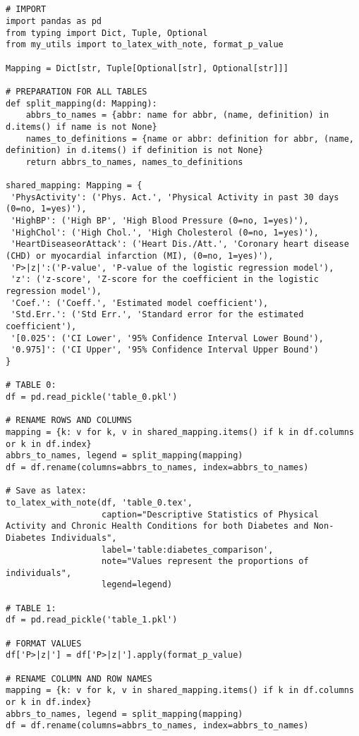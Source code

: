 \documentclass[11pt]{article}
\begin{document}
\begin{verbatim}


# IMPORT
import pandas as pd
from typing import Dict, Tuple, Optional
from my_utils import to_latex_with_note, format_p_value

Mapping = Dict[str, Tuple[Optional[str], Optional[str]]]

# PREPARATION FOR ALL TABLES
def split_mapping(d: Mapping):
    abbrs_to_names = {abbr: name for abbr, (name, definition) in d.items() if name is not None}
    names_to_definitions = {name or abbr: definition for abbr, (name, definition) in d.items() if definition is not None}
    return abbrs_to_names, names_to_definitions

shared_mapping: Mapping = {
 'PhysActivity': ('Phys. Act.', 'Physical Activity in past 30 days (0=no, 1=yes)'),
 'HighBP': ('High BP', 'High Blood Pressure (0=no, 1=yes)'),
 'HighChol': ('High Chol.', 'High Cholesterol (0=no, 1=yes)'),
 'HeartDiseaseorAttack': ('Heart Dis./Att.', 'Coronary heart disease (CHD) or myocardial infarction (MI), (0=no, 1=yes)'),
 'P>|z|':('P-value', 'P-value of the logistic regression model'),
 'z': ('z-score', 'Z-score for the coefficient in the logistic regression model'),
 'Coef.': ('Coeff.', 'Estimated model coefficient'),
 'Std.Err.': ('Std Err.', 'Standard error for the estimated coefficient'),
 '[0.025': ('CI Lower', '95% Confidence Interval Lower Bound'),
 '0.975]': ('CI Upper', '95% Confidence Interval Upper Bound')
}

# TABLE 0:
df = pd.read_pickle('table_0.pkl')

# RENAME ROWS AND COLUMNS
mapping = {k: v for k, v in shared_mapping.items() if k in df.columns or k in df.index}
abbrs_to_names, legend = split_mapping(mapping)
df = df.rename(columns=abbrs_to_names, index=abbrs_to_names)

# Save as latex:
to_latex_with_note(df, 'table_0.tex',
                   caption="Descriptive Statistics of Physical Activity and Chronic Health Conditions for both Diabetes and Non-Diabetes Individuals", 
                   label='table:diabetes_comparison',
                   note="Values represent the proportions of individuals",
                   legend=legend)

# TABLE 1:
df = pd.read_pickle('table_1.pkl')

# FORMAT VALUES 
df['P>|z|'] = df['P>|z|'].apply(format_p_value)

# RENAME COLUMN AND ROW NAMES
mapping = {k: v for k, v in shared_mapping.items() if k in df.columns or k in df.index}
abbrs_to_names, legend = split_mapping(mapping)
df = df.rename(columns=abbrs_to_names, index=abbrs_to_names)


\end{verbatim}
\end{document}
